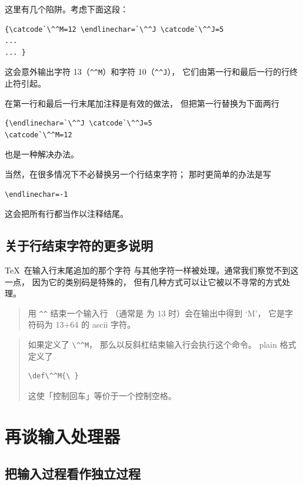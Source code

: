 \documentclass[a4paper]{rapport3}
\def\ascii{{\sc ascii}}
\newenvironment{example}{\begin{quotation}}{\end{quotation}}
\begin{document}
这里有几个陷阱。考虑下面这段：
\begin{verbatim}
{\catcode`\^^M=12 \endlinechar=`\^^J \catcode`\^^J=5
...
... }
\end{verbatim}
这会意外输出字符 13（\verb-^^M-）和字符 10（\verb-^^J-），
它们由第一行和最后一行的行终止符引起。

在第一行和最后一行末尾加注释是有效的做法，
但把第一行替换为下面两行
\begin{verbatim}
{\endlinechar=`\^^J \catcode`\^^J=5
\catcode`\^^M=12
\end{verbatim}
也是一种解决办法。

当然，在很多情况下不必替换另一个行结束字符；
那时更简单的办法是写 \begin{verbatim}
\endlinechar=-1 
\end{verbatim}
这会把所有行都当作以注释结尾。

\subsection{关于行结束字符的更多说明}

\TeX\ 在输入行末尾追加的那个字符
与其他字符一样被处理。通常我们察觉不到这一点，
因为它的类别码是特殊的，
但有几种方式可以让它被以不寻常的方式处理。

\begin{example} 用 \verb>^^> 结束一个输入行
（通常是  为 13 时）会在输出中得到 `M'，
它是字符码为 13+64 的 \ascii{} 字符。
\end{example}

\begin{example} 如果定义了 \verb>\^^M>，
那么以反斜杠结束输入行会执行这个命令。
plain 格式定义了
\begin{verbatim}
\def\^^M{\ }
\end{verbatim}
这使「控制回车」等价于一个控制空格。
\end{example}

\section{再谈输入处理器}

\subsection{把输入过程看作独立过程}
\end{document}
